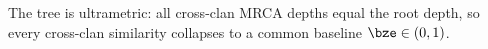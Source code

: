 \begin{assumption}\label{asm:clock}
The tree is ultrametric: all cross-clan MRCA depths equal the root depth, so every
cross-clan similarity collapses to a common baseline $\bze\in(0,1)$.
\end{assumption}

